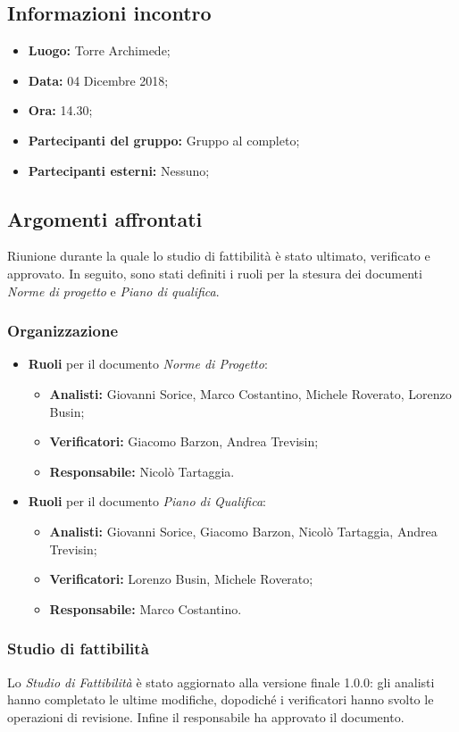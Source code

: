 \subsection{Informazioni incontro}
\begin{itemize}
	\item { \textbf{Luogo:} Torre Archimede;  }
	\item { \textbf{Data:} 04 Dicembre 2018; }
	\item { \textbf{Ora:} 14.30; }
	\item { \textbf{Partecipanti del gruppo:} Gruppo al completo; }
	\item { \textbf{Partecipanti esterni:} Nessuno; }
\end{itemize}


\subsection{Argomenti affrontati}
Riunione durante la quale lo studio di fattibilità è stato ultimato, verificato e approvato. In seguito, sono stati definiti i ruoli per la stesura dei documenti \emph{Norme di progetto} e \emph{Piano di qualifica}.

\subsubsection{Organizzazione}
\begin{itemize}
	\item { \textbf{Ruoli} per il documento \emph{Norme di Progetto}:} 
	\begin{itemize}
		\item { \textbf{Analisti:} Giovanni Sorice, Marco Costantino, Michele Roverato, Lorenzo Busin;}
		\item { \textbf{Verificatori:} Giacomo Barzon, Andrea Trevisin;}
		\item { \textbf{Responsabile:} Nicolò Tartaggia.} \\
	\end{itemize}
	\item { \textbf{Ruoli} per il documento \emph{Piano di Qualifica}:} 
	\begin{itemize}
		\item { \textbf{Analisti:} Giovanni Sorice, Giacomo Barzon, Nicolò Tartaggia, Andrea Trevisin;}
		\item { \textbf{Verificatori:} Lorenzo Busin, Michele Roverato;}
		\item { \textbf{Responsabile:} Marco Costantino.}
	\end{itemize}
\end{itemize}

\subsubsection{Studio di fattibilità}
Lo \emph{Studio di Fattibilità} è stato aggiornato alla versione finale 1.0.0: gli analisti hanno completato le ultime modifiche, dopodiché i verificatori hanno svolto le operazioni di revisione. Infine il responsabile ha approvato il documento.
